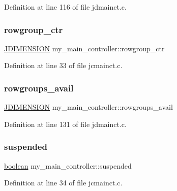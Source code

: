 Definition at line 116 of file jdmainct.\+c.

\mbox{\label{structmy__main__controller_a41bedbcd86bdc7611550440e02b8f93b}} 
\subsubsection{\texorpdfstring{rowgroup\_ctr}{rowgroup\_ctr}}
{\footnotesize\ttfamily \mbox{\hyperlink{jmorecfg_8h_a04ed4674f6f1d0d50ec241531e38274f}{J\+D\+I\+M\+E\+N\+S\+I\+ON}} my\+\_\+main\+\_\+controller\+::rowgroup\+\_\+ctr}



Definition at line 33 of file jcmainct.\+c.

\mbox{\label{structmy__main__controller_a8fdc8a382fc0be7922e5913b16cbf7dc}} 
\subsubsection{\texorpdfstring{rowgroups\_avail}{rowgroups\_avail}}
{\footnotesize\ttfamily \mbox{\hyperlink{jmorecfg_8h_a04ed4674f6f1d0d50ec241531e38274f}{J\+D\+I\+M\+E\+N\+S\+I\+ON}} my\+\_\+main\+\_\+controller\+::rowgroups\+\_\+avail}



Definition at line 131 of file jdmainct.\+c.

\mbox{\label{structmy__main__controller_aaae0f416fa5716cf5e0d295a191b2186}} 
\subsubsection{\texorpdfstring{suspended}{suspended}}
{\footnotesize\ttfamily \mbox{\hyperlink{jmorecfg_8h_a7c6368b321bd9acd0149b030bb8275ed}{boolean}} my\+\_\+main\+\_\+controller\+::suspended}



Definition at line 34 of file jcmainct.\+c.

